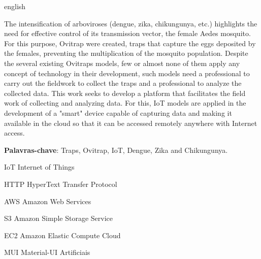 \documentclass[
	12pt,				%
	openright,			%
	oneside,			%
	a4paper,			%
	chapter=TITLE,		%
	english,			%
	brazil				%
	]{abntex2}
\begin{document}
\begin{resumo}[Abstract]
\begin{otherlanguage*}{english}

The intensification of arboviroses (dengue, zika, chikungunya, etc.) highlights the need for effective control of its transmission vector, 
the female Aedes mosquito. For this purpose, Ovitrap were created, traps that capture the eggs deposited by the females, preventing the 
multiplication of the mosquito population. Despite the several existing Ovitraps models, few or almost none of them apply any concept of 
technology in their development, such models need a professional to carry out the fieldwork to collect the traps and a professional to 
analyze the collected data. This work seeks to develop a platform that facilitates the field work of collecting and analyzing data. For 
this, IoT models are applied in the development of a "smart" device capable of capturing data and making it available in the cloud so that 
it can be accessed remotely anywhere with Internet access.

\textbf{Palavras-chave}: Traps, Ovitrap, IoT, Dengue, Zika and Chikungunya.

\end{otherlanguage*}
\end{resumo}


\listoffigures*
\cleardoublepage

\listoftables*
\cleardoublepage

\begin{siglas}
  \item[IoT] Internet of Things
  \item[HTTP] HyperText Transfer Protocol
  \item[AWS] Amazon Web Services
  \item[S3] Amazon Simple Storage Service
  \item[EC2] Amazon Elastic Compute Cloud
  \item[MUI] Material-UI 
Artificiais 
\end{siglas}

\tableofcontents*
\cleardoublepage
\end{document}
